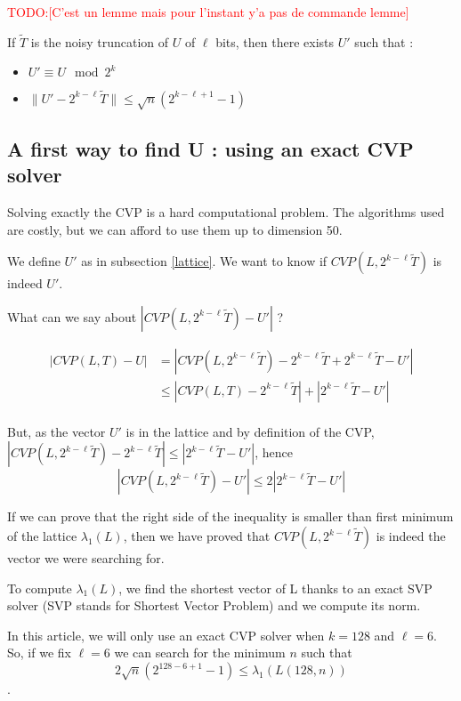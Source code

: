 \documentclass[submission,svgnames,journal=tosc]{iacrtrans}
\newcommand{\todo}[1]{\textcolor{red}{TODO:[#1]}}
\begin{document}
\todo{C'est un lemme mais pour l'instant y'a pas de commande lemme}
\begin{theorem}
	If $\widetilde{T}$ is the noisy truncation of \(U\) of \(\ell\) bits, then there exists \(U'\) such that :
	\begin{itemize}
		\item \(U'\equiv U \mod 2^k\)
		\item \(\lVert U' -2^{k-\ell} \widetilde{T} \rVert \leqslant \sqrt{n}(2^{k-\ell+1}-1) \)
	\end{itemize}
\end{theorem}


\subsection{A first way to find U : using an exact CVP solver}

Solving exactly the CVP is a hard computational problem. The algorithms used are costly, but we can afford to use them up to dimension 50.

We define \(U'\) as in subsection \ref{lattice}. We want to know if \(CVP(L,2^{k-\ell}\widetilde{T})\) is indeed \(U'\).

What can we say about \(|CVP(L,2^{k-\ell}\widetilde{T})-U'|\) ?

\begin{align*}
|CVP(L,T)-U| &= |CVP(L,2^{k-\ell}\widetilde{T})-2^{k-\ell}\widetilde{T}+2^{k-\ell}\widetilde{T}-U'|\\
& \leqslant |CVP(L,T)-2^{k-\ell}\widetilde{T}|+|2^{k-\ell}\widetilde{T}-U'|\\
\end{align*}

But, as the vector \(U'\) is in the lattice and by definition of the CVP, \(|CVP(L,2^{k-\ell}\widetilde{T})-2^{k-\ell}\widetilde{T}| \leqslant |2^{k-\ell}\widetilde{T}-U'| \), hence 
\[|CVP(L,2^{k-\ell}\widetilde{T})-U'|\leqslant 2|2^{k-\ell}\widetilde{T}-U'|\]

If we can prove that the right side of the inequality is smaller than first minimum of the lattice \(\lambda_1(L)\), then we have proved that \(CVP(L,2^{k-\ell}\widetilde{T})\) is indeed the vector we were searching for.

To compute \(\lambda_1(L)\), we find the shortest vector of L thanks to an exact SVP solver (SVP stands for Shortest Vector Problem) and we compute its norm.


In this article, we will only use an exact CVP solver when \(k = 128\) and \(\ell = 6\). So, if we fix \(\ell = 6\) we can search for the minimum \(n\) such that \[2\sqrt{n}(2^{128-6+1}-1) \leqslant \lambda_1(L(128,n))\].
\end{document}
